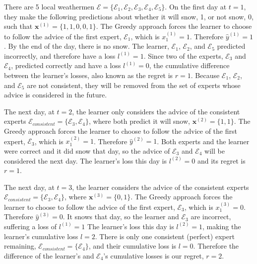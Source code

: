 \documentclass[11pt]{article}
\begin{document}
\begin{addmargin}[2em]{2em}%
There are 5 local weathermen $\mathcal{E} = \{\mathcal{E}_1, \mathcal{E}_2, \mathcal{E}_3, \mathcal{E}_4, \mathcal{E}_5 \}$. On the first day at ${t = 1}$, they make the following predictions about whether it will snow, 1, or not snow, 0, such that $\textbf{x}^{(1)} = \{1, 1, 0, 0, 1\}$. The Greedy approach forces the learner to choose to follow the advice of the first expert, $\mathcal{E}_1$, which is ${x}^{(1)}_1 = 1$. Therefore $ {\hat{y}^{(1)}} = 1$. By the end of the day, there is no snow. The learner, $\mathcal{E}_1$, $\mathcal{E}_2$, and $\mathcal{E}_5$ predicted incorrectly, and therefore have a loss $l^{(1)} = 1$. Since two of the experts, $\mathcal{E}_3$ and $\mathcal{E}_4$, predicted correctly and have a loss $l^{(1)} = 0$, the cumulative difference between the learner's losses, also known as the regret is $r = 1$. Because $\mathcal{E}_1$, $\mathcal{E}_2$, and $\mathcal{E}_5$ are not consistent, they will be removed from the set of experts whose advice is considered in the future. 

The next day, at ${t = 2}$, the learner only considers the advice of the consistent experts $\mathcal{E}_{consistent} = \{\mathcal{E}_3, \mathcal{E}_4 \}$, where both predict it will snow, $\textbf{x}^{(2)} = \{1, 1\}$. The Greedy approach forces the learner to choose to follow the advice of the first expert, $\mathcal{E}_3$, which is ${x}^{(2)}_1 = 1$. Therefore $ {\hat{y}^{(2)}} = 1$. 
Both experts and the learner were correct and it did snow that day, so the advice of  $\mathcal{E}_3$ and $\mathcal{E}_4$ will be considered the next day.
The learner's loss this day is $l^{(2)} = 0$ and its regret is $r = 1$. 

The next day, at ${t = 3}$, the learner considers the advice of the consistent experts $\mathcal{E}_{consistent} = \{\mathcal{E}_3, \mathcal{E}_4 \}$, where $\textbf{x}^{(3)} = \{0, 1\}$. The Greedy approach forces the learner to choose to follow the advice of the first expert, $\mathcal{E}_3$, which is ${x}^{(3)}_1 = 0$. Therefore $ {\hat{y}^{(3)}} = 0$. It snows that day, so the learner and $\mathcal{E}_3$ are incorrect, suffering a loss of $l^{(1)} = 1$
The learner's loss this day is $l^{(2)} = 1$, making the learner's cumulative loss $l = 2$. There is only one consistent (perfect) expert remaining, $\mathcal{E}_{consistent} = \{ \mathcal{E}_4 \}$, and their cumulative loss is $l = 0$. Therefore the difference of the learner's and $\mathcal{E}_4$'s cumulative losses is our regret, $r = 2$.
\end{addmargin}
\end{document}
